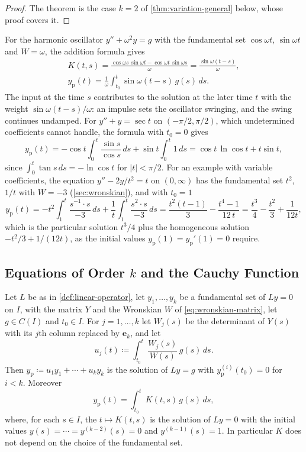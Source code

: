 \begin{proof}
The theorem is the case $k=2$ of \cref{thm:variation-general} below, whose proof covers it.
\end{proof}

For the harmonic oscillator $y''+\omega^2y=g$ with the fundamental set $\cos\omega t$, $\sin\omega t$ and $W=\omega$, the addition formula gives
\[
\begin{gathered}
K(t,s)=\frac{\cos\omega s\,\sin\omega t-\cos\omega t\,\sin\omega s}{\omega}=\frac{\sin\omega(t-s)}\omega,\\
y_{\mathrm p}(t)=\frac1\omega\int_{t_0}^t\sin\omega(t-s)\,g(s)\,ds .
\end{gathered}
\]
The input at the time $s$ contributes to the solution at the later time $t$ with the weight $\sin\omega(t-s)/\omega$: an impulse sets the oscillator swinging, and the swing continues undamped. For $y''+y=\sec t$ on $(-\pi/2,\pi/2)$, which undetermined coefficients cannot handle, the formula with $t_0=0$ gives
\[
y_{\mathrm p}(t)=-\cos t\int_0^t\frac{\sin s}{\cos s}\,ds+\sin t\int_0^t1\,ds=\cos t\,\ln\cos t+t\sin t ,
\]
since $\int_0^t\tan s\,ds=-\ln\cos t$ for $|t|<\pi/2$. For an example with variable coefficients, the equation $y''-2y/t^2=t$ on $(0,\infty)$ has the fundamental set $t^2$, $1/t$ with $W=-3$ (\cref{sec:wronskian}), and with $t_0=1$
\[
y_{\mathrm p}(t)=-t^2\int_1^t\frac{s^{-1}\cdot s}{-3}\,ds+\frac1t\int_1^t\frac{s^2\cdot s}{-3}\,ds=\frac{t^2(t-1)}3-\frac{t^4-1}{12\,t}=\frac{t^3}4-\frac{t^2}3+\frac1{12t} ,
\]
which is the particular solution $t^3/4$ plus the homogeneous solution $-t^2/3+1/(12t)$, as the initial values $y_{\mathrm p}(1)=y_{\mathrm p}'(1)=0$ require.

\subsection{Equations of Order \texorpdfstring{$k$}{k} and the Cauchy Function}

\begin{theorem}
\label{thm:variation-general}
Let $L$ be as in \cref{def:linear-operator}, let $y_1,\ldots,y_k$ be a fundamental set of $Ly=0$ on $I$, with the matrix $Y$ and the Wronskian $W$ of \eqref{eq:wronskian-matrix}, let $g\in C(I)$ and $t_0\in I$. For $j=1,\ldots,k$ let $W_j(s)$ be the determinant of $Y(s)$ with its $j$th column replaced by $\mathbf e_k$, and let
\[
u_j(t)\coloneqq\int_{t_0}^t\frac{W_j(s)}{W(s)}\,g(s)\,ds .
\]
Then $y_{\mathrm p}\coloneqq u_1y_1+\cdots+u_ky_k$ is the solution of $Ly=g$ with $y_{\mathrm p}^{(i)}(t_0)=0$ for $i<k$. Moreover
\begin{equation}
y_{\mathrm p}(t)=\int_{t_0}^tK(t,s)\,g(s)\,ds,
\label{eq:cauchy-function}
\end{equation}
where, for each $s\in I$, the  $t\mapsto K(t,s)$ is the solution of $Ly=0$ with the initial values $y(s)=\cdots=y^{(k-2)}(s)=0$ and $y^{(k-1)}(s)=1$. In particular $K$ does not depend on the choice of the fundamental set.
\end{theorem}

